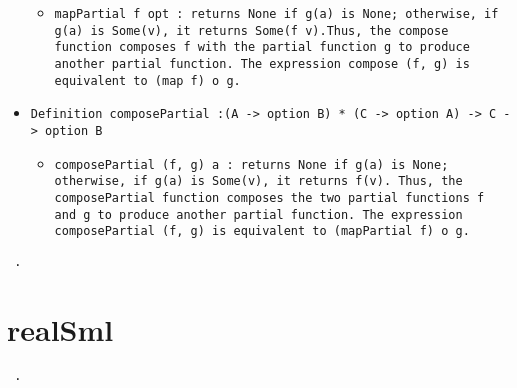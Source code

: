 \documentclass[11pt]{report}
\begin{document}
\begin{itemize}
\begin{itemize}
\item  \begin{flushleft} \texttt{mapPartial f opt : returns None if g(a) is None; otherwise, if g(a) is Some(v), it returns Some(f v).Thus, the compose function composes f with the partial function g to produce another partial function. The expression compose (f, g) is equivalent to (map f) o g. } \end{flushleft}



\end{itemize}

\item  \texttt{Definition composePartial :(A -> option B) * (C -> option A) -> C -> option B}

\begin{itemize}
\item  \begin{flushleft} \texttt{composePartial (f, g) a : returns None if g(a) is None; otherwise, if g(a) is Some(v), it returns f(v). Thus, the composePartial function composes the two partial functions f and g to produce another partial function. The expression composePartial (f, g) is equivalent to (mapPartial f) o g.} \end{flushleft}

\end{itemize}

\end{itemize}
\begin{coqdoccode}
\coqdocemptyline
\coqdocemptyline
\coqdocnoindent
\texttt{ .\coqdoceol}
\coqdocemptyline
\end{coqdoccode}
\section*{realSml}

\begin{coqdoccode}
\coqdocemptyline
\coqdocnoindent
\texttt{ .\coqdoceol}
\coqdocemptyline
\end{coqdoccode}
\end{document}
